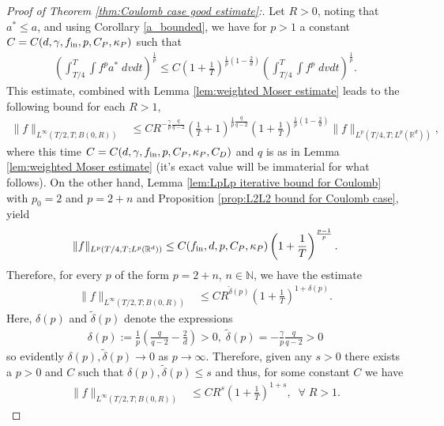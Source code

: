 \documentclass[12pt,american]{amsart}
\numberwithin{equation}{section}
\theoremstyle{plain}
\theoremstyle{definition}                  %
\def\astar{{a^*}}
\def\fin{f_{\textnormal{in}}}
\begin{document}
\begin{proof}[Proof of Theorem \ref{thm:Coulomb case good estimate}:] Let $R>0$, noting that $\astar\leq a$, and using Corollary \ref{a_bounded}, we have for $p>1$ a constant $C=C(d,\gamma,\fin,p,C_P,\kappa_P)$ such that
\begin{align*}	
  \left ( \int_{T/4}^{T}\int f^{p}\astar\;dvdt\right )^{\frac{1}{p}} \leq C\left (1+\frac{1}{T} \right )^{\frac{1}{p}\left (1-\frac{2}{d}\right)} \left ( \int_{T/4}^{T}\int  f^{p}\;dvdt\right )^{\frac{1}{p}}.	
\end{align*}
This estimate, combined with Lemma \ref{lem:weighted Moser estimate} leads to the following bound for each $R>1$,
\begin{align*}
   \|f\|_{L^\infty({T}/{2},T; B(0,R))} & \leq CR^{-\frac{\gamma}{p}\frac{q}{q-2}}\left (\frac{1}{T}+1 \right )^{\frac{1}{p}\frac{q}{q-2}}\left (1+\frac{1}{T} \right )^{\frac{1}{p}\left ( 1-\frac{2}{d}\right ) }  \|f\|_{L^{p}(T/4,T; L^{p}(\mathbb{R}^d))},  
 \end{align*}
 where this time $C=C(d,\gamma,\fin,p,C_P,\kappa_P,C_D)$ and $q$ is as in Lemma \ref{lem:weighted Moser estimate} (it's exact value will be immaterial for what follows). On the other hand, Lemma \ref{lem:LpLp iterative bound for Coulomb} with $p_0=2$ and $p=2+n$ and Proposition \ref{prop:L2L2 bound for Coulomb case}, yield
  \begin{align*}
    \|f\|_{L^{p}(T/4,T; L^{p}(\mathbb{R}^d))}  \leq C(\fin,d,p,C_P,\kappa_P)\left (1+\frac{1}{T}\right)^{\frac{p-1}{p}}. 
  \end{align*}
  Therefore, for every $p$ of the form $p=2+n$, $n\in\mathbb{N}$, we have the estimate
   \begin{align*}
   \|f\|_{L^\infty({T}/{2},T; B(0, R))} & \leq  CR^{\tilde \delta(p)}\left (1 +\frac{1}{T} \right )^{1+\delta(p)}.
   \end{align*}
  Here, $\delta(p)$ and $\tilde \delta(p)$ denote the expressions
  \begin{align*}
    \delta(p) := \frac{1}{p}\left(\frac{q}{q-2} -\frac{2}{d}\right)  >0,\; \tilde \delta(p) = -\frac{\gamma}{p}\frac{q}{q-2} >0
  \end{align*}
 so evidently $\delta(p),\tilde \delta(p) \to 0$ as $p\to\infty$. Therefore, given any $s>0$ there exists a $p>0$ and $C$ such that $\delta(p),\tilde \delta(p)\leq s$ and thus, for some constant $C$ we have 
\begin{align*}
   \|f\|_{L^\infty({T}/{2},T; B(0, R))} & \leq C R^{s}\left (1 +\frac{1}{T} \right )^{1+s},\;\;\forall\;R>1.
\end{align*}

\end{proof}
\end{document}
